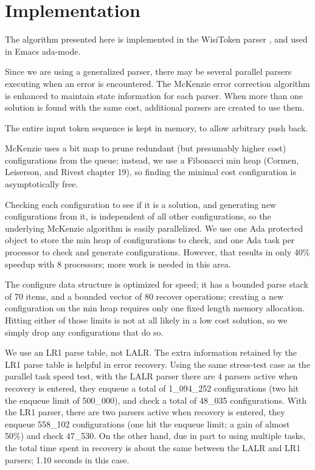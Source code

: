 \documentclass[authordraft]{acmart}
\begin{document}
\section{Implementation}
\label{sect:implementation}
The algorithm presented here is implemented in the WisiToken parser
\citep{wisitoken}, and used in Emacs ada-mode.

Since we are using a generalized parser, there may be several parallel
parsers executing when an error is encountered. The McKenzie error
correction algorithm is enhanced to maintain state information for
each parser. When more than one solution is found with the same cost,
additional parsers are created to use them.

The entire input token sequence is kept in memory, to allow arbitrary
push back.

McKenzie uses a bit map to prune redundant (but presumably higher
cost) configurations from the queue; instead, we use a Fibonacci min
heap (Cormen, Leiserson, and Rivest \citet{algorithms_2009} chapter
19), so finding the minimal cost configuration is asymptotically free.

Checking each configuration to see if it is a solution, and generating
new configurations from it, is independent of all other
configurations, so the underlying McKenzie algorithm is easily
parallelized. We use one Ada protected object to store the min heap of
configurations to check, and one Ada task per processor to check and
generate configurations. However, that results in only 40\% speedup
with 8 processors; more work is needed in this area.

The configure data structure is optimized for speed; it has a bounded
parse stack of 70 items, and a bounded vector of 80 recover
operations; creating a new configuration on the min heap requires only
one fixed length memory allocation. Hitting either of those limits is
not at all likely in a low cost solution, so we simply drop any
configurations that do so.

We use an LR1 parse table, not LALR. The extra information retained by
the LR1 parse table is helpful in error recovery. Using the same
stress-test case as the parallel task speed test, with the LALR parser
there are 4 parsers active when recovery is entered, they enqueue a
total of 1\_094\_252 configurations (two hit the enqueue limit of
500\_000), and check a total of 48\_035 configurations. With the LR1
parser, there are two parsers active when recovery is entered, they
enqueue 558\_102 configurations (one hit the enqueue limit; a gain of
almost 50\%) and check 47\_530. On the other hand, due in part to
using multiple tasks, the total time spent in recovery is about the
same between the LALR and LR1 parsers; 1.10 seconds in this case.
\end{document}
